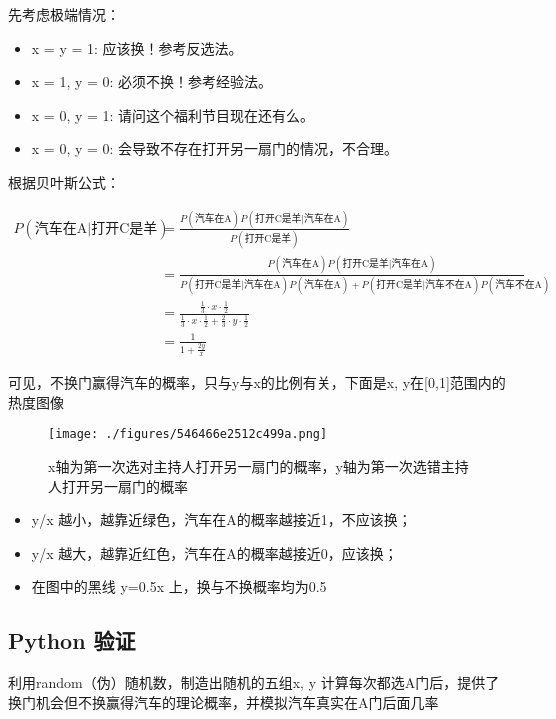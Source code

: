 先考虑极端情况：

\begin{itemize}
\item x = y = 1: 应该换！参考反选法。
\item x = 1, y = 0: 必须不换！参考经验法。
\item x = 0, y = 1: 请问这个福利节目现在还有么。
\item x = 0, y = 0: 会导致不存在打开另一扇门的情况，不合理。
\end{itemize}

根据贝叶斯公式：

\begin{align}
\nonumber
P(\text{汽车在A}|\text{打开C是羊})&=\frac{P(\text{汽车在A})P(\text{打开C是羊}|\text{汽车在A})}{P(\text{打开C是羊})}\\
\nonumber
&=\frac{P(\text{汽车在A})P(\text{打开C是羊}|\text{汽车在A})}{P(\text{打开C是羊}|\text{汽车在A})P(\text{汽车在A})+P(\text{打开C是羊}|\text{汽车不在A})P(\text{汽车不在A})}\\
\nonumber
&=\frac{\frac{1}{3}\cdot x\cdot \frac{1}{2}}{\frac{1}{3}\cdot x\cdot \frac{1}{2}+\frac{2}{3}\cdot y\cdot \frac{1}{2}}\\
\nonumber
&=\frac{1}{1+\frac{2y}{x}}
\end{align}

可见，不换门赢得汽车的概率，只与y与x的比例有关，下面是x, y在[0,1]范围内的热度图像

\begin{figure}[ht]
\centering
\texttt{[image: ./figures/546466e2512c499a.png]}
\caption{x轴为第一次选对主持人打开另一扇门的概率，y轴为第一次选错主持人打开另一扇门的概率} \label {fig_MontyH}
\end{figure}

\begin{itemize}
\item y/x 越小，越靠近绿色，汽车在A的概率越接近1，不应该换；
\item y/x 越大，越靠近红色，汽车在A的概率越接近0，应该换；
\item 在图中的黑线 y=0.5x 上，换与不换概率均为0.5
\end{itemize}

\subsection{Python 验证}
利用random（伪）随机数，制造出随机的五组x, y 计算每次都选A门后，提供了换门机会但不换赢得汽车的理论概率，并模拟汽车真实在A门后面几率

